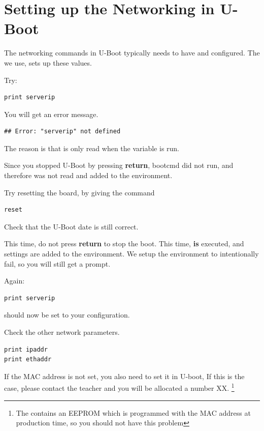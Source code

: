 \clearpage
\section{Setting up the \devboard Networking in U-Boot}

The networking commands in U-Boot typically needs to have  and 
 configured. The  we use, sets up these values.

Try:

\begin{verbatim}
print serverip
\end{verbatim}

You will get an error message.

\begin{verbatim}
## Error: "serverip" not defined  
\end{verbatim}

The reason is that  is only read when the  variable is run.

Since you stopped U-Boot by pressing {\bf return}, bootcmd did not run,
and therefore  was not read and added to the environment.

Try resetting the board, by giving the command 

\begin{verbatim}
reset
\end{verbatim}

Check that the U-Boot date is still correct.

This time, do not press {\bf return} to stop the boot. This time,  {\bf is} executed,
and  settings are added to the environment.
We setup the environment to intentionally fail, so you will still get a prompt.

Again:

\begin{verbatim}
print serverip
\end{verbatim}

 should now be set to your configuration.

Check the other network parameters.
\begin{verbatim}
print ipaddr
print ethaddr
\end{verbatim}

If the MAC address is not set, you also need to set it in U-boot,
If this is the case, please contact the teacher and you will be allocated
a number XX. \footnote{The \devboard contains an EEPROM which is programmed with the MAC address
 at production time, so you should not have this problem}

